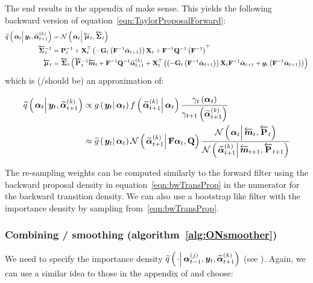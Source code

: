 The end results in the appendix of \cite{fearnhead10} make sense. This yields the following backward version of equation~\eqref{eqn:TaylorProposalForward}:
%
\begin{equation}\begin{split}
	\IDAproxC{\vec{\alpha}_t}{\vec{y}_t, \particB{\vec{\alpha}}{t + 1}{k}} &=   %
		\normalC{\vec{\alpha}_t}{\vecLarrow{\mu}_t}{\matLarrow{\Sigma}_t} \\
%
	\matLarrow{\Sigma}_t^{-1} &= 
		\mat{P}_t^{-1} + 
		\mat{X}_t^\top\Lparen{-\mat{G}_t\Lparen{\mat{F}^{-1}\vecb{\alpha}_{t + 1}}}
		\mat{X}_t + \mat{F}^{-1}\mat{Q}^{-1}\Lparen{\mat{F}^{-1}}^\top  \\
%
	\vecLarrow{\mu}_t 
	 &=  \matLarrow{\Sigma}_t \Lparen{
		\matLarrow{P}_t^{-1}\vecLarrow{m}_t + 
		\mat{F}^{-1}\mat{Q}^{-1}\particB{\vec{\alpha}}{t + 1}{k} + 
		\mat{X}_t^\top
		\Lparen{
			\Lparen{-\mat{G}_t\Lparen{\mat{F}^{-1}\vecb{\alpha}_{t + 1}}}
			\mat{X}_t\mat{F}^{-1}\vecb{\alpha}_{t + 1} +
			\vec{g}_t\Lparen{\mat{F}^{-1}\vecb{\alpha}_{t + 1}}
		}}
\end{split}\end{equation}
%
%
which is (/should be) an approximation of:

\begin{equation}\begin{split}
	\IDAproxC{\vec{\alpha}_t}{\vec{y}_t, \particB{\vec{\alpha}}{t + 1}{k}} & \propto  
		\optorC{g}{\vec{y}_t}{\vec{\alpha}_t}
		\optorC{f}{\particB{\vec{\alpha}}{t + 1}{k}}{\vec{\alpha}_t}
		\frac{\gamma_t\Lparen{\vec{\alpha}_t}}{\gamma_{t + 1}\Lparen{\particB{\vec{\alpha}}{t + 1}{k}}} \\
%
	& \approx \optorC{\widetilde{g}}{\vec{y}_t}{\vec{\alpha}_t}
		\normalC{\particB{\vec{\alpha}}{t + 1}{k}}{\mat{F}\vec{\alpha}_t}{\mat{Q}}
		\frac{
			\normalC{\vec{\alpha}_t}{\vecLarrow{m}_t}{\matLarrow{P}_t}
		}{ %
			\normalC{\particB{\vec{\alpha}}{t + 1}{k}}{\vecLarrow{m}_{t + 1}}{\matLarrow{P}_{t + 1}}
		}
\end{split}\end{equation}

The re-sampling weights can be computed similarly to the forward filter using the backward proposal density in equation~\eqref{eqn:bwTransProp} in the numerator for the backward transition density. We can also use a bootstrap like filter with the importance density by sampling from~\eqref{eqn:bwTransProp}.

\subsubsection*{Combining / smoothing (algorithm~\ref{alg:ONsmoother})}
We need to specify the importance density $\IDAproxC{\cdot}{\partic{\vec{\alpha}}{t-1}{j},\vec{y}_t, \particB{\vec{\alpha}}{t+1}{k}}$ (see \citet[page 453] {fearnhead10}). Again, we can use a similar idea to those in the appendix of \cite{fearnhead10} and choose:

